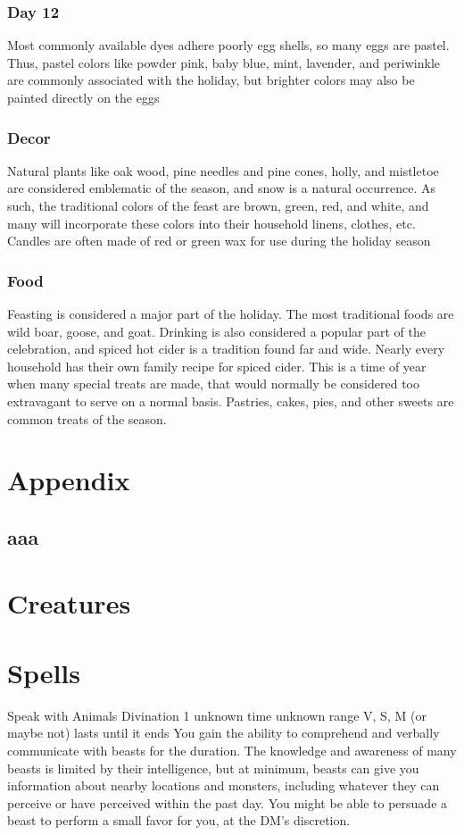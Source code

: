 \documentclass[10pt,a4paper,twoside,bg=print,twocolumn,openany,nodeprecatedcode]{dndbook}
\begin{document}
\subsection{Day 12}
Most commonly available dyes adhere poorly egg shells, so many eggs are pastel. Thus, pastel colors like powder pink, baby blue, mint, lavender, and periwinkle are commonly associated with the holiday, but brighter colors may also be painted directly on the eggs
\subsection{Decor}
Natural plants like oak wood, pine needles and pine cones, holly, and mistletoe are considered emblematic of the season, and snow is a natural occurrence. As such, the traditional colors of the feast are brown, green, red, and white, and many will incorporate these colors into their household linens, clothes, etc. Candles are often made of red or green wax for use during the holiday season
\subsection{Food}
Feasting is considered a major part of the holiday. The most traditional foods are wild boar, goose, and goat. Drinking is also considered a popular part of the celebration, and spiced hot cider is a tradition found far and wide. Nearly every household has their own family recipe for spiced cider. This is a time of year when many special treats are made, that would normally be considered too extravagant to serve on a normal basis. Pastries, cakes, pies, and other sweets are common treats of the season.
\appendix
\chapter{Appendix}

\section{aaa}

\chapter{Creatures}

\chapter{Spells}
\DndSpellHeader%
{Speak with Animals}
{Divination 1}
{unknown time}
{unknown range}
{V, S, M (or maybe not)}
{lasts until it ends}
You gain the ability to comprehend and verbally communicate with beasts for the duration. The knowledge and awareness of many beasts is limited by their intelligence, but at minimum, beasts can give you information about nearby locations and monsters, including whatever they can perceive or have perceived within the past day. You might be able to persuade a beast to perform a small favor for you, at the DM's discretion.
\end{document}
